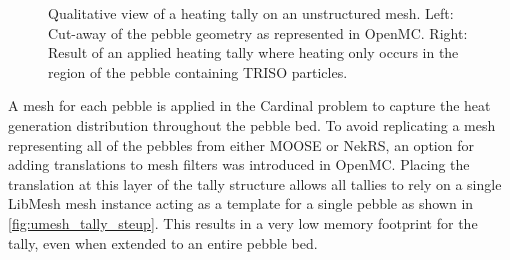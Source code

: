 \begin{figure}
    \centering
    \hspace*{.2in}
    \caption{Qualitative view of a heating tally on an unstructured mesh. Left: Cut-away of the pebble geometry as represented in OpenMC. Right: Result of an applied heating tally where heating only occurs in the region of the pebble containing TRISO particles.}
    \label{fig:pebble_umesh}
\end{figure}

A mesh for each pebble is applied in the Cardinal problem to capture the heat generation distribution throughout the pebble bed. To avoid replicating a mesh representing all of the pebbles from either MOOSE or NekRS, an option for adding translations to mesh filters was introduced in OpenMC. Placing the translation at this layer of the tally structure allows all tallies to rely on a single LibMesh mesh  instance acting as a template for a single pebble as shown in \autoref{fig:umesh_tally_steup}. This results in a very low memory footprint for the tally, even when extended to an entire pebble bed.

